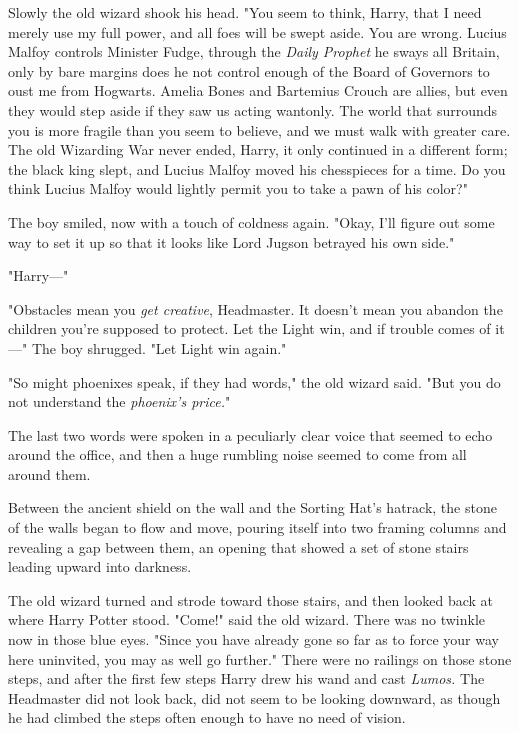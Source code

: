 Slowly the old wizard shook his head. "You seem to think, Harry, that I need
merely use my full power, and all foes will be swept aside. You are wrong.
Lucius Malfoy controls Minister Fudge, through the \emph{Daily Prophet} he
sways all Britain, only by bare margins does he not control enough of the Board
of Governors to oust me from Hogwarts. Amelia Bones and Bartemius Crouch are
allies, but even they would step aside if they saw us acting wantonly. The
world that surrounds you is more fragile than you seem to believe, and we must
walk with greater care. The old Wizarding War never ended, Harry, it only
continued in a different form; the black king slept, and Lucius Malfoy moved
his chesspieces for a time. Do you think Lucius Malfoy would lightly permit you
to take a pawn of his color?"

The boy smiled, now with a touch of coldness again. "Okay, I'll figure out some
way to set it up so that it looks like Lord Jugson betrayed his own side."

"Harry---"

"Obstacles mean you \emph{get creative}, Headmaster. It doesn't mean you
abandon the children you're supposed to protect. Let the Light win, and if
trouble comes of it---" The boy shrugged. "Let Light win again."

"So might phoenixes speak, if they had words," the old wizard said. "But you do
not understand the \emph{phoenix's price.}"

The last two words were spoken in a peculiarly clear voice that seemed to echo
around the office, and then a huge rumbling noise seemed to come from all
around them.

Between the ancient shield on the wall and the Sorting Hat's hatrack, the stone
of the walls began to flow and move, pouring itself into two framing columns
and revealing a gap between them, an opening that showed a set of stone stairs
leading upward into darkness.

The old wizard turned and strode toward those stairs, and then looked back at
where Harry Potter stood. "Come!" said the old wizard. There was no twinkle now
in those blue eyes. "Since you have already gone so far as to force your way
here uninvited, you may as well go further."
\sbreak
There were no railings on those stone steps, and after the first few steps
Harry drew his wand and cast \emph{Lumos.} The Headmaster did not look back,
did not seem to be looking downward, as though he had climbed the steps often
enough to have no need of vision.

